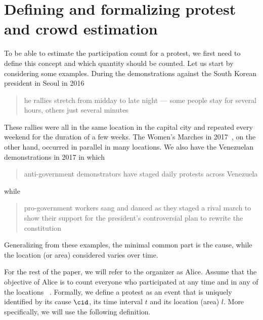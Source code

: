 \section{Defining and formalizing protest and crowd estimation}%
\label{SystemModel}


To be able to estimate the participation count for a protest, we first need to define this concept and which quantity should be counted.
Let us start by considering some examples.
During the demonstrations against the South Korean president in Seoul in 2016
\blockcquote{2016DemonstrationsInSeoul}{%
  he rallies stretch from midday to late night --- some people stay for several hours, others just several minutes%
}.
These rallies were all in the same location in the capital city and repeated every weekend for the duration of a few weeks.
The Women's Marches in 2017~\cite{2017WomensMarchesInUS}, on the other hand, occurred in parallel in many locations.
We also have the Venezuelan demonstrations in 2017 in which \blockcquote{2017VenezuelaProtestFrequency}{%
  anti-government demonstrators have staged daily protests across Venezuela%
} while
\blockcquote{AlJazeeraOnVenezuela2017}{%
  pro-government workers sang and danced as they staged a rival march to show their support for the president's controversial plan to rewrite the constitution%
}.
Generalizing from these examples, the minimal common part is the cause,%
\label{CauseIsTheCommonDenominator} while the location (or area) considered 
varies over time.

For the rest of the paper, we will refer to the organizer as Alice.
Assume that the objective of Alice is to count everyone who
participated at any time and in any of the
locations~\cite{2016DemonstrationsInSeoul} \sonja{commented out for
  repetition: %
}.
Formally, we define a protest as an event that is uniquely identified by its cause \(\cid\), its time interval \(t\) and its location (area) \(l\).
More specifically, we will use the following definition.

